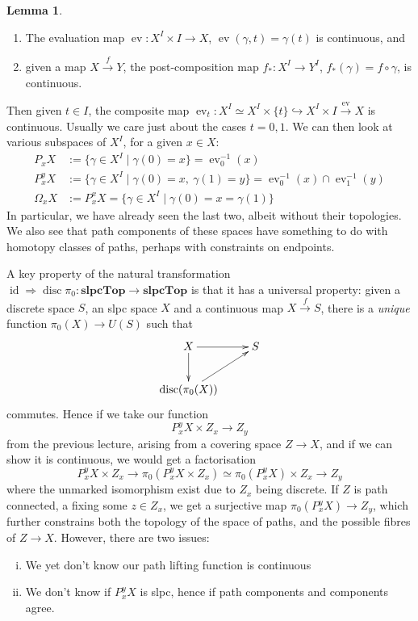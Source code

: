 \documentclass{tufte-handout}
\def\into {\hookrightarrow}
\def\slpcTop {\mathbf{slpcTop}}
\DeclareMathOperator{\disc}{disc}
\DeclareMathOperator{\id}{id}
\DeclareMathOperator{\ev}{ev}
\theoremstyle{definition}
\newtheorem{lemma}{Lemma}
\begin{document}
\begin{lemma}

\begin{enumerate}
\item The evaluation map $\ev\colon X^I \times I\to X$, $\ev(\gamma,t) = \gamma(t)$ is continuous, and 
\item given a map $X\xrightarrow{f} Y$, the post-composition map $f_*\colon X^I \to Y^I$, $f_*(\gamma) = f\circ \gamma$, is continuous.
\end{enumerate}
\end{lemma}

Then given $t\in I$, the composite map $\ev_t\colon X^I \simeq X^I\times\{t\} \into X^I \times I \xrightarrow{\ev} X$ is continuous.
Usually we care just about the cases $t=0,1$. 
We can then look at various subspaces of $X^I$, for a given $x\in X$:
\begin{align*}
P_xX & := \{\gamma \in X^I\mid \gamma(0)=x\} = \ev_0^{-1}(x)\\
P_x^yX & := \{\gamma \in X^I\mid \gamma(0)=x,\ \gamma(1)=y\} = \ev_0^{-1}(x)\cap \ev_1^{-1}(y)\\
\Omega_x X & := P_x^x X = \{\gamma \in X^I \mid \gamma(0) = x = \gamma(1)\}
\end{align*}
In particular, we have already seen the last two, albeit without their topologies. We also see that path 
components of these spaces have something to do with homotopy classes of paths, perhaps with
constraints on endpoints.

A key property of the natural transformation $\id \Rightarrow \disc\pi_0\colon \slpcTop\to\slpcTop$
is that it has a universal property: given a discrete space $S$, an slpc space $X$ and a continuous
map $X\xrightarrow{f} S$, there is a \emph{unique} function $\pi_0(X)\to U(S)$ such that
\[
\xymatrix{
X \ar[r] \ar[d] & S\\
\disc(\pi_0(X)) \ar[ur]
}
\]
commutes. Hence if we take our function 
\begin{equation}\label{eq:path_space_action_fibres}
P_x^yX \times Z_x \to Z_y
\end{equation}
from the previous lecture, 
arising from a covering space $Z\to X$, and if we can show it is continuous, we would get a 
factorisation
\[
P_x^y X\times Z_x\to \pi_0(P_x^y X\times Z_x) \simeq \pi_0(P_x^yX)\times Z_x \to Z_y
\]
where the unmarked isomorphism exist due to $Z_x$ being discrete.
If $Z$ is path connected, a fixing some $z\in Z_x$, we get a surjective map $\pi_0(P_x^y X)\to Z_y$,
which further constrains both the topology of the space of paths, and the possible fibres of 
$Z\to X$. However, there are two issues:
\begin{enumerate}[(i)]
\item We yet don't know our path lifting function is continuous
\item We don't know if $P_x^y X$ is slpc, hence if path components and components agree.
\end{enumerate}
\end{document}
